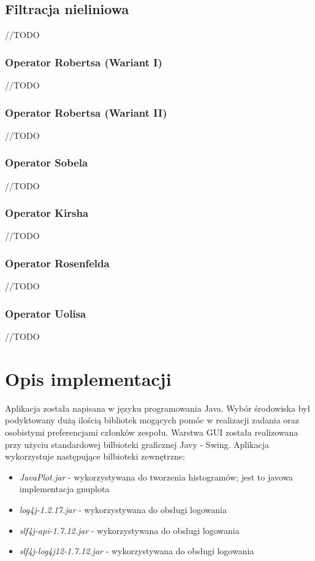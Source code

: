 \documentclass{classrep}
\begin{document}
\subsection{Filtracja nieliniowa}
//TODO

\subsubsection{Operator Robertsa (Wariant I)}
//TODO

\subsubsection{Operator Robertsa (Wariant II)}
//TODO

\subsubsection{Operator Sobela}
//TODO

\subsubsection{Operator Kirsha}
//TODO

\subsubsection{Operator Rosenfelda}
//TODO

\subsubsection{Operator Uolisa}
//TODO

\section{Opis implementacji}
Aplikacja została napisana w języku programowania Java. Wybór środowiska był podyktowany dużą ilością bibliotek mogących pomóc w realizacji zadania oraz osobistymi preferencjami członków zespołu. Warstwa GUI została realizowana przy użyciu standardowej bilbioteki graficznej Javy - Swing. Aplikacja wykorzystuje następujące bilbioteki zewnętrzne:
\begin{itemize}
\item \textit{JavaPlot.jar} - wykorzystywana do tworzenia histogramów; jest to javowa implementacja gnuplota 
\item \textit{log4j-1.2.17.jar} - wykorzystywana do obsługi logowania
\item \textit{slf4j-api-1.7.12.jar} - wykorzystywana do obsługi logowania
\item \textit{slf4j-log4j12-1.7.12.jar} - wykorzystywana do obsługi logowania
\end{itemize}
\end{document}
